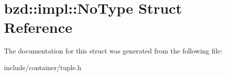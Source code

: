\hypertarget{structbzd_1_1impl_1_1NoType}{}\section{bzd\+:\+:impl\+:\+:No\+Type Struct Reference}
\label{structbzd_1_1impl_1_1NoType}


The documentation for this struct was generated from the following file\+:\begin{DoxyCompactItemize}
\item 
include/container/tuple.\+h\end{DoxyCompactItemize}
